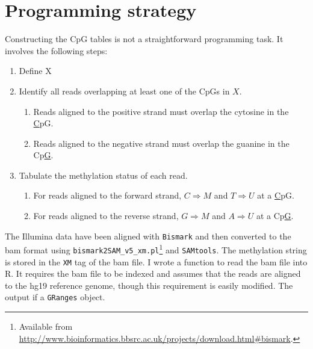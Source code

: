 \documentclass[a4paper]{article}
\begin{document}
\clearpage

\section{Programming strategy}
Constructing the CpG tables is not a straightforward programming task. It involves the following steps:
\begin{enumerate}
\item Define X
\item Identify all reads overlapping at least one of the CpGs in $X$.
\begin{enumerate}
\item Reads aligned to the positive strand must overlap the cytosine in the \underline{C}pG.
\item Reads aligned to the negative strand must overlap the guanine in the Cp\underline{G}.
\end{enumerate}
\item Tabulate the methylation status of each read.
\begin{enumerate}
\item For reads aligned to the forward strand, $C \Rightarrow M$ and $T \Rightarrow U$ at a \underline{C}pG.
\item For reads aligned to the reverse strand, $G \Rightarrow M$ and $A \Rightarrow U$ at a Cp\underline{G}.
\end{enumerate}
\end{enumerate}

The Illumina data have been aligned with \texttt{Bismark} and then converted to the bam format using \texttt{bismark2SAM\_v5\_xm.pl}\footnote{Available from \url{http://www.bioinformatics.bbsrc.ac.uk/projects/download.html#bismark}.} and \texttt{SAMtools}. The methylation string is stored in the \texttt{XM} tag of the bam file. I wrote a function to read the bam file into R. It requires the bam file to be indexed and assumes that the reads are aligned to the hg19 reference genome, though this requirement is easily modified. The output if a \texttt{GRanges} object.
\end{document}
